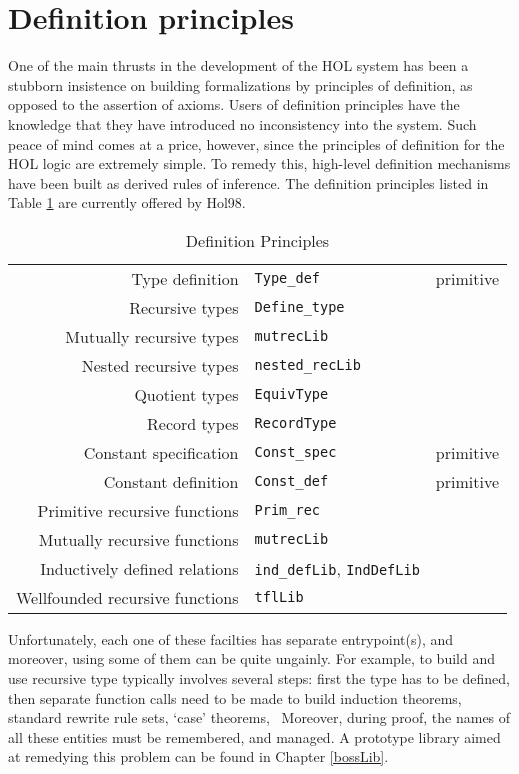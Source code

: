 \documentclass[12pt,fleqn,layout,a4paper]{report}
\begin{document}
\section{Definition principles}

One of the main thrusts in the development of the HOL system has been a
stubborn insistence on building formalizations by principles of
definition, as opposed to the assertion of axioms. Users of definition
principles have the knowledge that they have introduced no inconsistency
into the system.  Such peace of mind comes at a price, however, since
the principles of definition for the HOL logic are extremely simple. To
remedy this, high-level definition mechanisms have been built as derived
rules of inference. The definition principles listed in Table \ref{PoD}
are currently offered by Hol98.

\begin{table}[ht]
\begin{center}
\begin{tabular}{|r|l|r|} \hline
Type definition & \verb+Type_def+ & primitive \\
Recursive types & \verb+Define_type+ &  \\
Mutually recursive types & \verb+mutrecLib+ & \\
Nested recursive types & \verb+nested_recLib+ & \\
Quotient types & \verb+EquivType+ & \\
Record types & \verb+RecordType+ & \\\hline
Constant specification & \verb+Const_spec+ & primitive \\
Constant definition & \verb+Const_def+ & primitive \\
Primitive recursive functions & \verb+Prim_rec+ & \\
Mutually recursive functions & \verb+mutrecLib+ & \\
Inductively defined relations & \verb+ind_defLib+,  \verb+IndDefLib+ & \\
Wellfounded recursive functions & \verb+tflLib+ & \\
 \hline
\end{tabular}
\caption{Definition Principles}\label{PoD}
\end{center}\end{table}

Unfortunately, each one of these facilties has separate entrypoint(s),
and moreover, using some of them can be quite ungainly. For example, to
build and use recursive type typically involves several steps: first the
type has to be defined, then separate function calls need to be made to
build induction theorems, standard rewrite rule sets, `case' theorems,
\etc\ Moreover, during proof, the names of all these entities must be
remembered, and managed. A prototype library aimed at remedying this
problem can be found in Chapter \ref{bossLib}.
\end{document}
